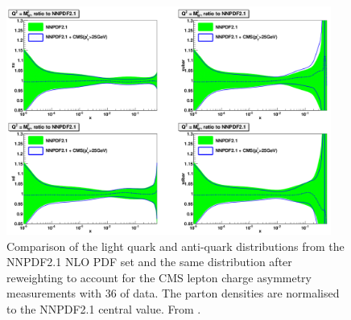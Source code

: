 \begin{figure}[htbp]
  \begin{center}
  \includegraphics*[width=0.95\textwidth]{effect}
  \caption[Comparison of the light quark and anti-quark distributions from the
NNPDF2.1 NLO PDF set and the same distribution after reweighting to account for
the CMS lepton charge asymmetry measurements with \unit{36}{\invpb} of data.]
{Comparison of the light quark and anti-quark distributions from the NNPDF2.1
NLO PDF set and the same distribution after reweighting to account for the CMS
lepton charge asymmetry measurements with \unit{36}{\invpb} of data.  The parton
densities are normalised to the NNPDF2.1 central value.  From
\cite{Ball:2011gg}. } \label{fig:effect}
  \end{center}
\end{figure}



